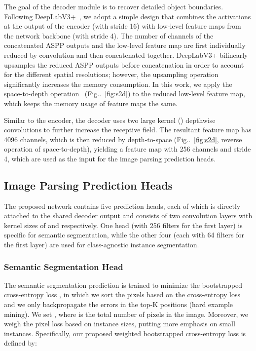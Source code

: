 \documentclass[10pt,twocolumn,letterpaper]{article}
\makeatletter
\def\@onedot{\ifx\@let@token.\else.\null\fi\xspace}
\DeclareRobustCommand\onedot{\futurelet\@let@token\@onedot}
\newcommand{\figref}[1]{Fig\onedot~\ref{#1}}
\makeatother
\begin{document}
The goal of the decoder module is to recover detailed object boundaries. Following DeepLabV3+~\cite{deeplabv3plus2018}, we adopt a simple design that combines the activations at the output of the encoder (with stride 16) with low-level feature maps from the network backbone (with stride 4). The number of channels of the concatenated ASPP outputs and the low-level feature map are first individually reduced by  convolution and then concatenated together. DeepLabV3+ bilinearly upsamples the reduced ASPP outputs before concatenation in order to account for the different spatial resolutions; however, the upsampling operation significantly increases the memory consumption. In this work, we apply the space-to-depth operation~\cite{shi2016real,sajjadi2018frame} (\figref{fig:s2d}) to the reduced low-level feature map, which keeps the memory usage of feature maps the same.

Similar to the encoder, the decoder uses two large kernel () depthwise convolutions to further increase the receptive field. The resultant feature map has 4096 channels, which is then reduced by depth-to-space (\figref{fig:s2d}, reverse operation of space-to-depth), yielding a feature map with 256 channels and stride 4, which are used as the input for the image parsing prediction heads.

\subsection{Image Parsing Prediction Heads}

The proposed network contains five prediction heads, each of which is directly attached to the shared decoder output and consists of two convolution layers with kernel sizes of  and  respectively. One head (with 256 filters for the first  layer) is specific for semantic segmentation, while the other four (each with 64 filters for the first  layer) are used for class-agnostic instance segmentation.

\subsubsection{Semantic Segmentation Head}
\label{subsubsec:semantic_segmentation_predicton}

The semantic segmentation prediction is trained to minimize the bootstrapped cross-entropy loss \cite{wu2016bridging, bulo2017loss, pohlen2016full}, in which we sort the pixels based on the cross-entropy loss and we only backpropagate the errors in the top-K positions (hard example mining). We set , where  is the total number of pixels in the image. Moreover, we weigh the pixel loss based on instance sizes, putting more emphasis on small instances. Specifically, our proposed weighted bootstrapped cross-entropy loss is defined by:
\end{document}
